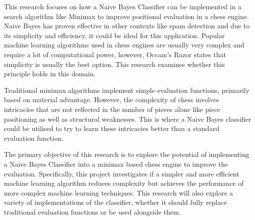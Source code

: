 \documentclass[20pt]{informatics-report}
\begin{document}
This research focuses on how a Naive Bayes Classifier can be implemented in a search algorithm like Minimax to improve positional evaluation in a chess engine. Naive Bayes has proven effective in other contexts like spam detection and due to its simplicity and efficiency, it could be ideal for this application. Popular machine learning algorithms used in chess engines are usually very complex and require a lot of computational power, however, Occam's Razor states that simplicity is usually the best option. This research examines whether this principle holds in this domain. 

Traditional minimax algorithms implement simple evaluation functions, primarily based on material advantage. However, the complexity of chess involves intricacies that are not reflected in the number of pieces alone like piece positioning as well as structural weaknesses. This is where a Naive Bayes classifier could be utilised to try to learn these intricacies better than a standard evaluation function.

The primary objective of this research is to explore the potential of implementing a Naive Bayes Classifier into a minimax based chess engine to improve the evaluation. Specifically, this project investigates if a simpler and more efficient machine learning algorithm reduces complexity but achieves the performance of more complex machine learning techniques. This research will also explore a variety of implementations of the classifier, whether it should fully replace traditional evaluation functions or be used alongside them.






% 

% 
% 
% 








\appendix
% 

% 
\end{document}
